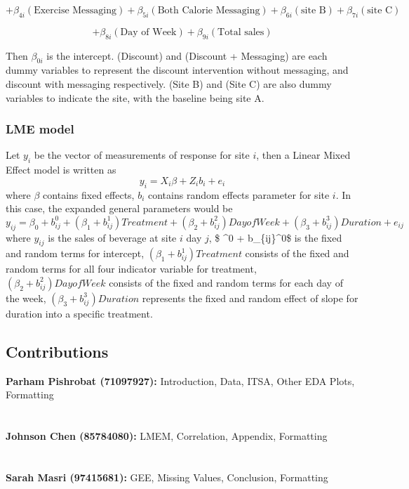 \documentclass[
]{article}
\begin{document}
\[
+ \beta_{4i} (\text{Exercise Messaging}) + \beta_{5i} (\text{Both Calorie Messaging}) + \beta_{6i} (\text{site B}) + \beta_{7i} (\text{site C})
\]

\[
+ \beta_{8i} (\text{Day of Week})+ \beta_{9i} (\text{Total sales})
\]

Then \(\beta_{0i}\) is the intercept. (Discount) and (Discount +
Messaging) are each dummy variables to represent the discount
intervention without messaging, and discount with messaging
respectively. (Site B) and (Site C) are also dummy variables to indicate
the site, with the baseline being site A.

\hypertarget{lme-model}{%
\subsubsection{LME model}\label{lme-model}}

Let \(y_i\) be the vector of measurements of response for site \(i\),
then a Linear Mixed Effect model is written as
\[y_i = X_i\beta + Z_i b_i + e_i\] where \(\beta\) contains fixed
effects, \(b_i\) contains random effects parameter for site \(i\). In
this case, the expanded general parameters would be
\[y_{ij}  = \beta_0 + b_{ij}^0 + (\beta_1 + b_{ij}^1)Treatment + (\beta_2 + b_{ij}^2)Day of Week +(\beta_3 + b_{ij}^3)Duration +e_{ij}\]
where \(y_{ij}\) is the sales of beverage at site \(i\) day \(j\), \$
\beta\^{}0 + b\_\{ij\}\^{}0\$ is the fixed and random terms for
intercept, \((\beta_1 + b_{ij}^1)Treatment\) consists of the fixed and
random terms for all four indicator variable for treatment,
\((\beta_2 + b_{ij}^2)Day of Week\) consists of the fixed and random
terms for each day of the week, \((\beta_3 + b_{ij}^3)Duration\)
represents the fixed and random effect of slope for duration into a
specific treatment.

\pagebreak

\hypertarget{contributions}{%
\subsection{Contributions}\label{contributions}}

\textbf{Parham Pishrobat (71097927):} Introduction, Data, ITSA, Other EDA Plots, Formatting\\ \\ \\
\textbf{Johnson Chen (85784080):}  \quad LMEM, Correlation, Appendix, Formatting\\ \\ \\
\textbf{Sarah Masri (97415681):} \quad \quad GEE, Missing Values, Conclusion, Formatting\\ \\ \\
\end{document}
